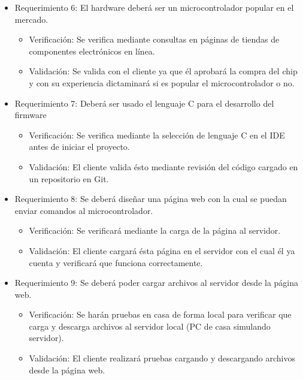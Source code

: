 \documentclass[
11pt, %
]{charter}
\begin{document}
\begin{itemize} 
\item Requerimiento 6: El hardware deberá ser un microcontrolador popular en el mercado.

\begin{itemize}
	\item Verificación: Se verifica mediante consultas en páginas de tiendas de componentes electrónicos en línea.
	\item Validación: Se valida con el cliente ya que él aprobará la compra del chip y con su experiencia dictaminará si es popular el microcontrolador o no.
\end{itemize}

\end{itemize}

\begin{itemize} 
\item Requerimiento 7: Deberá ser usado el lenguaje C para el desarrollo del firmware

\begin{itemize}
	\item Verificación: Se verifica mediante la selección de lenguaje C en el IDE antes de iniciar el proyecto.
	\item Validación: El cliente valida ésto mediante revisión del código cargado en un repositorio en Git.
\end{itemize}

\end{itemize}

\begin{itemize} 
\item Requerimiento 8: Se deberá diseñar una página web con la cual se puedan enviar comandos al microcontrolador.

\begin{itemize}
	\item Verificación: Se verificará mediante la carga de la página al servidor.
	\item Validación: El cliente cargará ésta página en el servidor con el cual él ya cuenta y verificará que funciona correctamente.
\end{itemize}

\end{itemize}

\begin{itemize} 
\item Requerimiento 9: Se deberá poder cargar archivos al servidor desde la página web.

\begin{itemize}
	\item Verificación: Se harán pruebas en casa de forma local para verificar que carga y descarga archivos al servidor local (PC de casa simulando servidor).
	\item Validación: El cliente realizará pruebas cargando y descargando archivos desde la página web. 
\end{itemize}

\end{itemize}
\end{document}
